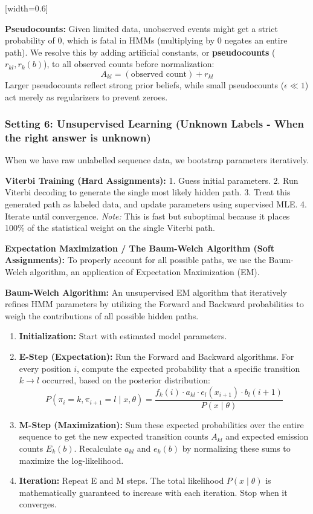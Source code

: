 [width=0.6\textwidth]

\sta \textbf{Pseudocounts:} Given limited data, unobserved events might get a strict probability of 0, which is fatal in HMMs (multiplying by 0 negates an entire path). We resolve this by adding artificial constants, or \textbf{pseudocounts} (\( r_{kl}, r_k(b) \)), to all observed counts before normalization:
\[ A_{kl} = (\text{observed count}) + r_{kl} \]
Larger pseudocounts reflect strong prior beliefs, while small pseudocounts (\( \epsilon \ll 1 \)) act merely as regularizers to prevent zeroes.

\subsubsection{Setting 6: Unsupervised Learning (Unknown Labels - When the right answer is unknown)}

When we have raw unlabelled sequence data, we bootstrap parameters iteratively.

\textbf{Viterbi Training (Hard Assignments):}
1. Guess initial parameters.
2. Run Viterbi decoding to generate the single most likely hidden path.
3. Treat this generated path as labeled data, and update parameters using supervised MLE.
4. Iterate until convergence.
\textit{Note:} This is fast but suboptimal because it places 100\% of the statistical weight on the single Viterbi path.

\textbf{Expectation Maximization / The Baum-Welch Algorithm (Soft Assignments):}
To properly account for all possible paths, we use the Baum-Welch algorithm, an application of Expectation Maximization (EM).

\begin{important}
  \textbf{Baum-Welch Algorithm:} An unsupervised EM algorithm that iteratively refines HMM parameters by utilizing the Forward and Backward probabilities to weigh the contributions of all possible hidden paths.
\end{important}

\begin{enumerate}
    \item \textbf{Initialization:} Start with estimated model parameters.
    \item \textbf{E-Step (Expectation):} Run the Forward and Backward algorithms. For every position \( i \), compute the expected probability that a specific transition \( k \to l \) occurred, based on the posterior distribution:
    \[ P(\pi_i = k, \pi_{i+1} = l \mid x, \theta) = \frac{f_k(i) \cdot a_{kl} \cdot e_l(x_{i+1}) \cdot b_l(i+1)}{P(x \mid \theta)} \]
    \item \textbf{M-Step (Maximization):} Sum these expected probabilities over the entire sequence to get the new expected transition counts \( A_{kl} \) and expected emission counts \( E_k(b) \). Recalculate \( a_{kl} \) and \( e_k(b) \) by normalizing these sums to maximize the log-likelihood.
    \item \textbf{Iteration:} Repeat E and M steps. The total likelihood \( P(x \mid \theta) \) is mathematically guaranteed to increase with each iteration. Stop when it converges.
\end{enumerate}

